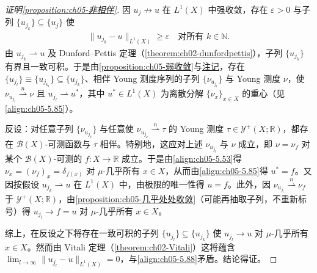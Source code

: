 \documentclass[../../main.tex]{subfiles}
\begin{document}
\begin{proof}[证明\cref{proposition:ch05-非相伴}]
因 $u_j\not\to u$ 在 $L^1(X)$ 中强收敛，存在 $\varepsilon>0$ 与子列 $\{u_{j_k}\}\subseteq\{u_j\}$ 使
\begin{align}
\|u_{j_k}-u\|_{L^1(X)}\geqslant\varepsilon
\quad\text{对所有 }k\in\mathbb{N}.\label{align:ch05-5.88}
\end{align}
由 $u_{j_k}\rightharpoonup u$ 及 Dunford--Pettis 定理（\cref{theorem:ch02-dunfordpettis}），子列 $\{u_{j_k}\}$ 有界且一致可积。于是由\cref{proposition:ch05-弱收敛}与\hyperref[remark:ch05-一致可积加强]{注记}，存在 $\{u_{j_l}\}\equiv\{u_{j_{k_l}}\}\subseteq\{u_{j_k}\}$、相伴 Young 测度序列的子列 $\{\nu_{u_{j_l}}\}$ 与 Young 测度 $\nu$，使 $\nu_{u_{j_l}}\stackrel{n}{\rightharpoonup}\nu$ 且 $u_{j_l}\rightharpoonup u^*$，其中 $u^*\in L^1(X)$ 为离散分解 $\{\nu_x\}_{x\in X}$ 的重心（见\eqref{align:ch05-5.85}）。

反设：对任意子列 $\{\nu_{u_{j_k}}\}$ 与任意使 $\nu_{u_{j_k}}\stackrel{n}{\rightharpoonup}\tau$ 的 Young 测度 $\tau\in\mathcal{Y}^+(X;\mathbb{R})$，都存在 $\mathscr{B}(X)$-可测函数与 $\tau$ 相伴。特别地，这应对上述 $\nu_{u_{j_l}}$ 与 $\nu$ 成立，即 $\nu=\nu_f$ 对某个 $\mathscr{B}(X)$-可测的 $f:X\to\mathbb{R}$ 成立。于是由\eqref{align:ch05-5.53}得 $\nu_x=(\nu_f)_x=\delta_{f(x)}$ 对 $\mu$-几乎所有 $x\in X$，从而由\eqref{align:ch05-5.85}得 $u^*=f$。又因按假设 $u_{j_k}\rightharpoonup u$ 在 $L^1(X)$ 中，由极限的唯一性得 $u=f$。此外，因 $\nu_{u_{j_l}}\stackrel{n}{\rightharpoonup}\nu_f$ 于 $\mathcal{Y}^+(X;\mathbb{R})$，由\cref{proposition:ch05-几乎处处收敛}（可能再抽取子列，不重新标号）得 $u_{j_l}\to f=u$ 对 $\mu$-几乎所有 $x\in X$。

综上，在反设之下将存在一致可积的子列 $\{u_{j_l}\}\subseteq\{u_{j_k}\}$ 使 $u_{j_l}\to u$ 对 $\mu$-几乎所有 $x\in X$。然而由 Vitali 定理（\cref{theorem:ch02-Vitali}）这将蕴含 $\lim_{l\to\infty}\|u_{j_l}-u\|_{L^1(X)}=0$，与\eqref{align:ch05-5.88}矛盾。结论得证。
\end{proof}
\end{document}
